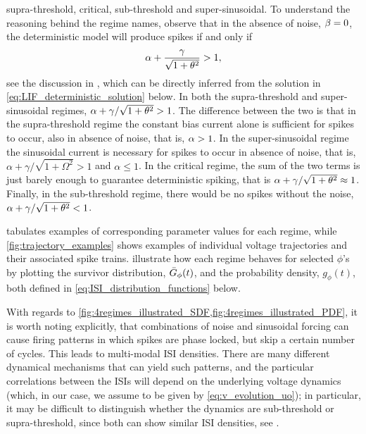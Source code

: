 supra-threshold, critical, sub-threshold and super-sinusoidal. 
To understand the reasoning behind the regime names, observe that in the absence
of noise, $\beta=0$, the deterministic model will produce spikes if and only if $$
\alpha + \frac{{\gamma }}{\sqrt{1 + { \theta}^2} } > 1, $$ see the discussion in
\cite{Burkitt2006b}, which can be directly inferred from the solution in
\cref{eq:LIF_deterministic_solution} below. In both the supra-threshold and
super-sinusoidal regimes, $ \alpha + {\gamma }/\sqrt{1 + { \theta}^2}  > 1$. The
difference between the two is that in the supra-threshold regime the constant
bias current alone is sufficient for spikes to occur, also in absence of noise,
that is,  $\alpha > 1$. In the super-sinusoidal regime the sinusoidal current is
necessary for spikes to occur in absence of noise, that is, $\alpha +
\gamma /
\sqrt{1+\Omega^2} > 1$ and $\alpha \leq 1$. In the critical regime, the sum of
the two terms is just barely enough to guarantee deterministic spiking, that is
$\alpha + {\gamma } / \sqrt{1 + { \theta}^2}  \approx 1$. Finally, in the sub-threshold regime,
there would be no spikes without the noise, $ \alpha + {\gamma } / \sqrt{1 + { \theta}^2} < 1$.

 tabulates examples of corresponding parameter values for each
regime, while \cref{fig:trajectory_examples} shows examples of individual
voltage trajectories and their associated spike trains.
 illustrate
 how each regime behaves for selected $\phi$'s by plotting the survivor
 distribution, ${ \bar{G} }_{\phi}(t)$, and the probability density, $g_{\phi}(t)$, both
 defined in \cref{eq:ISI_distribution_functions} below.
 
With regards to
\cref{fig:4regimes_illustrated_SDF,fig:4regimes_illustrated_PDF}, it is worth
noting explicitly, that combinations of noise and sinusoidal forcing can cause
firing patterns in which spikes are phase locked, but skip a certain number of
cycles. This leads to multi-modal ISI densities. There are many different
dynamical mechanisms that can yield such patterns, and the particular
correlations between the ISIs will depend on the underlying voltage dynamics
(which, in our case, we assume to be given by \cref{eq:v_evolution_uo}); in
particular, it may be difficult to distinguish whether the dynamics are
sub-threshold or supra-threshold, since both can show similar ISI densities,
see \cite{Longtin1995}.



